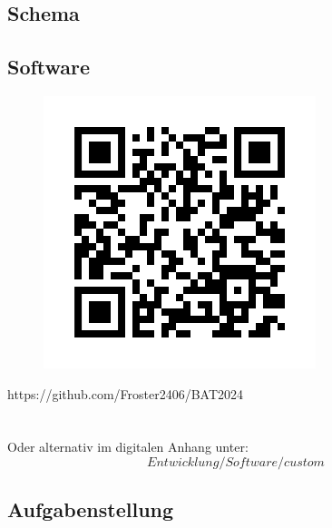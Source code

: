 \documentclass[12pt]{article}
\begin{document}
	\newpage
	\subsection*{Schema}
	\begin{minipage}[b]{\textwidth}
		
	\end{minipage}
	
	\newpage
	\subsection*{Software} \label{Anhang:Software}
	\begin{figure}[H]
		\centering
		\includegraphics[width=1\linewidth]{images/BAT_QR-Code_Github-Repo}
		\label{fig:batqr-codegithub-repo}
	\end{figure}
	https://github.com/Froster2406/BAT2024 \\ \\ \\
	Oder alternativ im digitalen Anhang unter:\\
	$$Entwicklung/Software/custom$$
	
	\newpage
	\subsection*{Aufgabenstellung}\label{Anhang:Aufgabenstellung}
	\begin{minipage}[b]{\textwidth}
		
	\end{minipage}
	\newpage
	\begin{minipage}[b]{\textwidth}
		
	\end{minipage}
	
\end{document}

